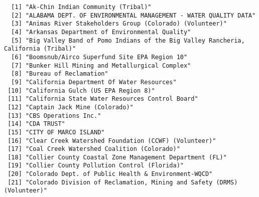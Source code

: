 \documentclass[
  12pt,
]{article}
\begin{document}
\begin{verbatim}
  [1] "Ak-Chin Indian Community (Tribal)"                                                                                    
  [2] "ALABAMA DEPT. OF ENVIRONMENTAL MANAGEMENT - WATER QUALITY DATA"                                                       
  [3] "Animas River Stakeholders Group (Colorado) (Volunteer)"                                                               
  [4] "Arkansas Department of Environmental Quality"                                                                         
  [5] "Big Valley Band of Pomo Indians of the Big Valley Rancheria, California (Tribal)"                                     
  [6] "Boomsnub/Airco Superfund Site EPA Region 10"                                                                          
  [7] "Bunker Hill Mining and Metallurgical Complex"                                                                         
  [8] "Bureau of Reclamation"                                                                                                
  [9] "California Department Of Water Resources"                                                                             
 [10] "California Gulch (US EPA Region 8)"                                                                                   
 [11] "California State Water Resources Control Board"                                                                       
 [12] "Captain Jack Mine (Colorado)"                                                                                         
 [13] "CBS Operations Inc."                                                                                                  
 [14] "CDA TRUST"                                                                                                            
 [15] "CITY OF MARCO ISLAND"                                                                                                 
 [16] "Clear Creek Watershed Foundation (CCWF) (Volunteer)"                                                                  
 [17] "Coal Creek Watershed Coalition (Colorado)"                                                                            
 [18] "Collier County Coastal Zone Management Department (FL)"                                                               
 [19] "Collier County Pollution Control (Florida)"                                                                           
 [20] "Colorado Dept. of Public Health & Environment-WQCD"                                                                   
 [21] "Colorado Division of Reclamation, Mining and Safety (DRMS) (Volunteer)"                                               

\end{verbatim}
\end{document}
